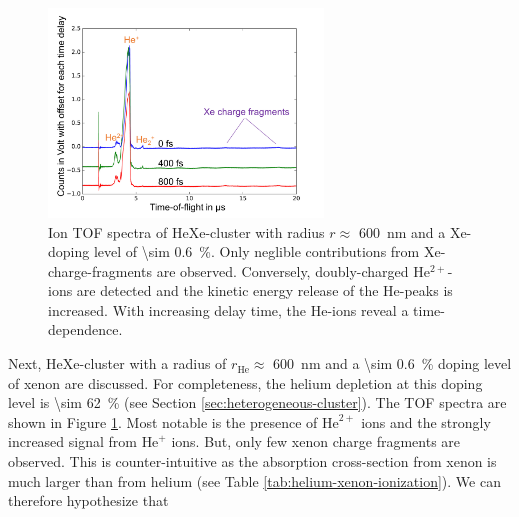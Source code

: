 %
\begin{figure}
	\centering
		\includegraphics[width=0.65\textwidth]{images/results/TOF-helium-xenon-cluster-60-2.png}
	\caption[TOF spectra of HeXe-clusters with a \SI{\sim 0.6}{\percent} Xe-doping at various $\Delta t$.]{Ion TOF spectra of HeXe-cluster with radius $r\approx$ \SI{600}{\nano\meter} and a Xe-doping level of \SI{\sim 0.6}{\percent}. Only neglible contributions from Xe-charge-fragments are observed. Conversely, doubly-charged He$^{2+}$-ions are detected and the kinetic energy release of the He-peaks is increased. With increasing delay time, the He-ions reveal a time-dependence.}
	\label{fig:TOF-helium-xenon-cluster-60}
\end{figure}
%
Next, HeXe-cluster with a radius of $r_{\text{He}}\approx$ \SI{600}{\nano\meter} and a \SI{\sim 0.6}{\percent} doping level of xenon are discussed. For completeness, the helium depletion at this doping level is \SI{\sim 62}{\percent} (see Section \ref{sec:heterogeneous-cluster}). The TOF spectra are shown in Figure \ref{fig:TOF-helium-xenon-cluster-60}. Most notable is the presence of $\text{He}^{2+}$ ions and the strongly increased signal from $\text{He}^{+}$ ions. But, only few xenon charge fragments are observed. This is counter-intuitive as the absorption cross-section from xenon is much larger than from helium (see Table \ref{tab:helium-xenon-ionization}). We can therefore hypothesize that \cite{Hoener-2008-JPB}%
